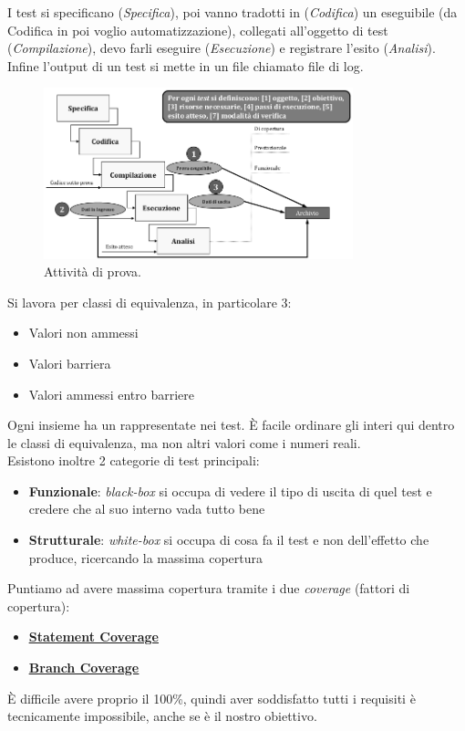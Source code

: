 		I test si specificano (\textit{Specifica}), poi vanno tradotti in (\textit{Codifica}) un eseguibile (da Codifica in poi voglio automatizzazione), collegati all'oggetto di test (\textit{Compilazione}), devo farli eseguire (\textit{Esecuzione}) e registrare l'esito (\textit{Analisi}). Infine l'output di un test si mette in un file chiamato file di log.

		\begin{figure}[H]
			\centering
			\includegraphics[width=0.8\textwidth]{img/prove}
			\caption{Attività di prova.}
		\end{figure}

		Si lavora per classi di equivalenza, in particolare 3:
		\begin{itemize}
			\item Valori non ammessi
			\item Valori barriera
			\item Valori ammessi entro barriere
		\end{itemize}
		Ogni insieme ha un rappresentate nei test.
		È facile ordinare gli interi qui dentro le classi di equivalenza, ma non altri valori come i numeri reali. \\
		Esistono inoltre 2 categorie di test principali:
		\begin{itemize}
			\item \textbf{Funzionale}: \textit{black-box} si occupa di vedere il tipo di uscita di quel test e credere che al suo interno vada tutto bene
			\item \textbf{Strutturale}: \textit{white-box} si occupa di cosa fa il test e non dell'effetto che produce, ricercando la massima copertura
		\end{itemize}
		Puntiamo ad avere massima copertura tramite i due \textit{coverage} (fattori di copertura): %
		\begin{itemize}
			\item \textbf{\underline{\hyperref[statementcoverage]{Statement Coverage}}}
			\item \textbf{\underline{\hyperref[branchcoverage]{Branch Coverage}}}
		\end{itemize}
		È difficile avere proprio il 100\%, quindi aver soddisfatto tutti i requisiti è tecnicamente impossibile, anche se è il nostro obiettivo.


